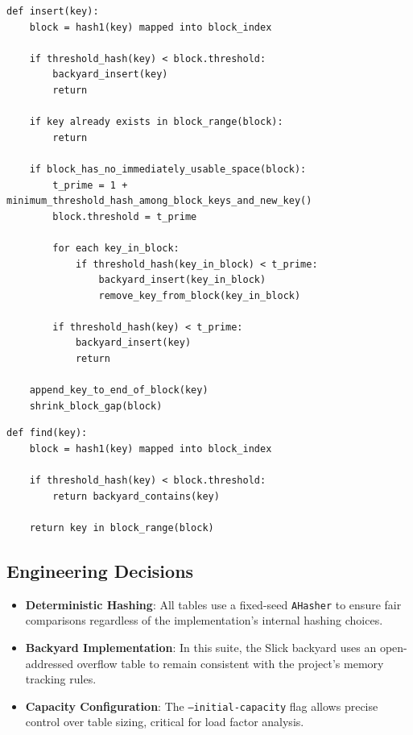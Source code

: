 \documentclass[11pt,a4paper]{article}
\begin{document}
\begin{lstlisting}[style=pseudocode, caption={Slick Hashing -- insert}]
def insert(key):
    block = hash1(key) mapped into block_index

    if threshold_hash(key) < block.threshold:
        backyard_insert(key)
        return

    if key already exists in block_range(block):
        return

    if block_has_no_immediately_usable_space(block):
        t_prime = 1 + minimum_threshold_hash_among_block_keys_and_new_key()
        block.threshold = t_prime

        for each key_in_block:
            if threshold_hash(key_in_block) < t_prime:
                backyard_insert(key_in_block)
                remove_key_from_block(key_in_block)

        if threshold_hash(key) < t_prime:
            backyard_insert(key)
            return

    append_key_to_end_of_block(key)
    shrink_block_gap(block)
\end{lstlisting}

\begin{lstlisting}[style=pseudocode, caption={Slick Hashing -- find}]
def find(key):
    block = hash1(key) mapped into block_index

    if threshold_hash(key) < block.threshold:
        return backyard_contains(key)

    return key in block_range(block)
\end{lstlisting}

\subsection{Engineering Decisions}

\begin{itemize}
  \item \textbf{Deterministic Hashing}: All tables use a fixed-seed \texttt{AHasher} to ensure fair comparisons regardless of the implementation's internal hashing choices.
  \item \textbf{Backyard Implementation}: In this suite, the Slick backyard uses an open-addressed overflow table to remain consistent with the project's memory tracking rules.
  \item \textbf{Capacity Configuration}: The \texttt{--initial-capacity} flag allows precise control over table sizing, critical for load factor analysis.
\end{itemize}
\end{document}
